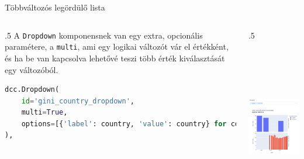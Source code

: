 \documentclass[english, aspectratio=169]{beamer}
\begin{document}
	\begin{frame}[fragile]{Többváltozós legördülő lista}
		\begin{columns}
			\begin{column}{.5\textwidth}
				A \texttt{Dropdown} komponensnek van egy extra, opcionális paramétere, a \texttt{multi}, ami egy logikai változót vár el értékként, és ha be van kapcsolva lehetővé teszi több érték kiválasztását egy változóból.\par\medskip
				\begin{lstlisting}[language=python]
dcc.Dropdown(
	id='gini_country_dropdown', 
	multi=True,
	options=[{'label': country, 'value': country} for country in gini_df['Country Name'].unique()]
),				
				\end{lstlisting}
			\end{column}
			\begin{column}{.5\textwidth}
				\begin{center}
					\includegraphics[width=7cm, height=7cm, keepaspectratio]{images/plots_24.png}
				\end{center}			
			\end{column}
		\end{columns}
	\end{frame}
	
\end{document}
